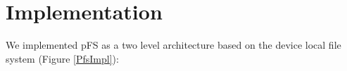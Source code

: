 
\section{Implementation}
\label{sec:impl}

%


We implemented pFS as a two level architecture based on the device
local file system (Figure \ref{PfsImpl}):

